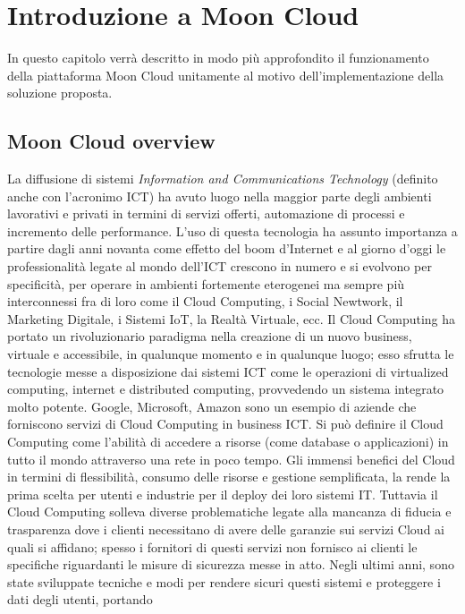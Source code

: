 \chapter{Introduzione a Moon Cloud}\label{chp:01-introduction}
In questo capitolo verrà descritto in modo più approfondito il funzionamento della piattaforma Moon Cloud unitamente al 
motivo dell'implementazione della soluzione proposta.
%
\section{Moon Cloud overview}
La diffusione di sistemi \textit{Information and Communications Technology} (definito anche con l'acronimo ICT) ha avuto luogo nella maggior 
parte degli ambienti lavorativi e privati in termini di servizi offerti, automazione di processi e incremento delle performance. L'uso di 
questa tecnologia ha assunto importanza a partire dagli anni novanta come effetto del boom d'Internet e al giorno d'oggi le professionalità 
legate al mondo dell'ICT crescono in numero e si evolvono per specificità, per operare in ambienti fortemente eterogenei ma sempre più 
interconnessi fra di loro come il Cloud Computing, i Social Newtwork, il Marketing Digitale, i Sistemi IoT, la Realtà Virtuale, ecc.
\vspace{0.5 cm}\hfill\break
Il Cloud Computing ha portato un rivoluzionario paradigma nella creazione di un nuovo business, virtuale e accessibile, in qualunque momento
e in qualunque luogo; esso sfrutta le tecnologie messe a disposizione dai sistemi ICT come le operazioni di virtualized computing,
internet e distributed computing, provvedendo un sistema integrato molto potente. Google, Microsoft, Amazon sono un esempio di 
aziende che forniscono servizi di Cloud Computing in business ICT. Si può definire il Cloud Computing come l'abilità di accedere a 
risorse (come database o applicazioni) in tutto il mondo attraverso una rete in poco tempo.\hfill\break
Gli immensi benefici del Cloud in termini di flessibilità, consumo delle risorse e gestione semplificata, la rende la prima scelta per 
utenti e industrie per il deploy dei loro sistemi IT. Tuttavia il Cloud Computing solleva diverse problematiche legate alla mancanza di 
fiducia e trasparenza dove i clienti necessitano di avere delle garanzie sui servizi Cloud ai quali si affidano; spesso i fornitori di 
questi servizi non fornisco ai clienti le specifiche riguardanti le misure di sicurezza messe in atto.\hfill\break
Negli ultimi anni, sono state sviluppate tecniche e modi per rendere sicuri questi sistemi e proteggere i dati degli utenti, portando 

